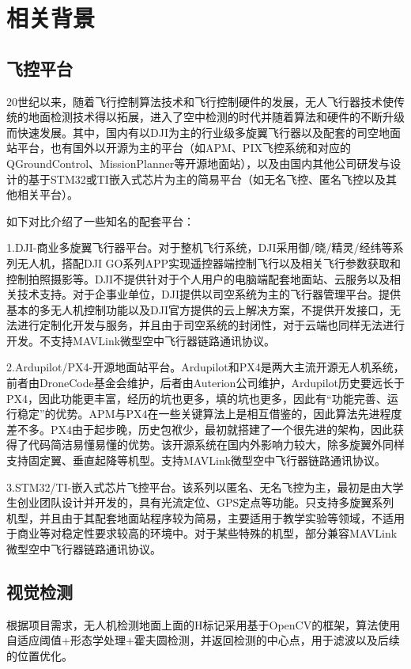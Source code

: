 \chapter{相关背景}
\section{飞控平台}

20世纪以来，随着飞行控制算法技术和飞行控制硬件的发展，无人飞行器技术使传统的地面检测技术得以拓展，进入了空中检测的时代并随着算法和硬件的不断升级而快速发展。其中，国内有以DJI为主的行业级多旋翼飞行器以及配套的司空地面站平台，也有国外以开源为主的平台（如APM、PIX飞控系统和对应的QGroundControl、MissionPlanner等开源地面站），以及由国内其他公司研发与设计的基于STM32或TI嵌入式芯片为主的简易平台（如无名飞控、匿名飞控以及其他相关平台）。

如下对比介绍了一些知名的配套平台：

1.DJI-商业多旋翼飞行器平台。对于整机飞行系统，DJI采用御/晓/精灵/经纬等系列无人机，搭配DJI GO系列APP实现遥控器端控制飞行以及相关飞行参数获取和控制拍照摄影等。DJI不提供针对于个人用户的电脑端配套地面站、云服务以及相关技术支持。对于企事业单位，DJI提供以司空系统为主的飞行器管理平台。提供基本的多无人机控制功能以及DJI官方提供的云上解决方案，不提供开发接口，无法进行定制化开发与服务，并且由于司空系统的封闭性，对于云端也同样无法进行开发。不支持MAVLink微型空中飞行器链路通讯协议。

2.Ardupilot/PX4-开源地面站平台。Ardupilot和PX4是两大主流开源无人机系统，前者由DroneCode基金会维护，后者由Auterion公司维护，Ardupilot历史要远长于PX4，因此功能更丰富，经历的坑也更多，填的坑也更多，因此有“功能完善、运行稳定”的优势。APM与PX4在一些关键算法上是相互借鉴的，因此算法先进程度差不多。PX4由于起步晚，历史包袱少，最初就搭建了一个很先进的架构，因此获得了代码简洁易懂易懂的优势。该开源系统在国内外影响力较大，除多旋翼外同样支持固定翼、垂直起降等机型。支持MAVLink微型空中飞行器链路通讯协议。

3.STM32/TI-嵌入式芯片飞控平台。该系列以匿名、无名飞控为主，最初是由大学生创业团队设计并开发的，具有光流定位、GPS定点等功能。只支持多旋翼系列机型，并且由于其配套地面站程序较为简易，主要适用于教学实验等领域，不适用于商业等对稳定性要求较高的环境中。对于某些特殊的机型，部分兼容MAVLink微型空中飞行器链路通讯协议。

\section{视觉检测}

根据项目需求，无人机检测地面上面的H标记采用基于OpenCV的框架，算法使用自适应阈值+形态学处理+霍夫圆检测，并返回检测的中心点，用于滤波以及后续的位置优化。

